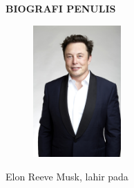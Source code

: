 \begin{center}
  \Large
  \textbf{BIOGRAFI PENULIS}
\end{center}


\vspace{2ex}

\begin{figure}
  \centering
  \vspace{-3ex}
  \includegraphics[width=0.3\textwidth]{gambar/elon.jpg}
  \vspace{-4ex}
\end{figure}

Elon Reeve Musk, lahir pada \lipsum[1]

\lipsum[2]
